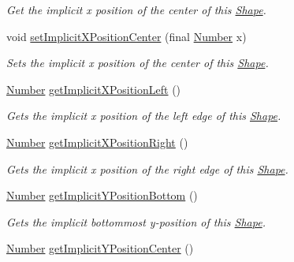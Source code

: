 \begin{DoxyCompactItemize}
\begin{DoxyCompactList}\small\item\em Get the implicit x position of the center of this \hyperlink{classcom_1_1aarrelaakso_1_1drawl_1_1_shape}{Shape}. \end{DoxyCompactList}\item 
void \hyperlink{classcom_1_1aarrelaakso_1_1drawl_1_1_shape_a945597709a9d79688e48a9802c86b13b}{set\+Implicit\+X\+Position\+Center} (final \hyperlink{interfacecom_1_1aarrelaakso_1_1drawl_1_1_number}{Number} x)
\begin{DoxyCompactList}\small\item\em Sets the implicit x position of the center of this \hyperlink{classcom_1_1aarrelaakso_1_1drawl_1_1_shape}{Shape}. \end{DoxyCompactList}\item 
\hyperlink{interfacecom_1_1aarrelaakso_1_1drawl_1_1_number}{Number} \hyperlink{classcom_1_1aarrelaakso_1_1drawl_1_1_shape_a2f272e8bfa625bb7959d1f722d5ac3df}{get\+Implicit\+X\+Position\+Left} ()
\begin{DoxyCompactList}\small\item\em Gets the implicit x position of the left edge of this \hyperlink{classcom_1_1aarrelaakso_1_1drawl_1_1_shape}{Shape}. \end{DoxyCompactList}\item 
\hyperlink{interfacecom_1_1aarrelaakso_1_1drawl_1_1_number}{Number} \hyperlink{classcom_1_1aarrelaakso_1_1drawl_1_1_shape_a15599ef4ee30a0ddd372f7cf1b155ce1}{get\+Implicit\+X\+Position\+Right} ()
\begin{DoxyCompactList}\small\item\em Gets the implicit x position of the right edge of this \hyperlink{classcom_1_1aarrelaakso_1_1drawl_1_1_shape}{Shape}. \end{DoxyCompactList}\item 
\hyperlink{interfacecom_1_1aarrelaakso_1_1drawl_1_1_number}{Number} \hyperlink{classcom_1_1aarrelaakso_1_1drawl_1_1_shape_a8d44b02976656bf4a81055a2dbae66cb}{get\+Implicit\+Y\+Position\+Bottom} ()
\begin{DoxyCompactList}\small\item\em Gets the implicit bottommost y-\/position of this \hyperlink{classcom_1_1aarrelaakso_1_1drawl_1_1_shape}{Shape}. \end{DoxyCompactList}\item 
\hyperlink{interfacecom_1_1aarrelaakso_1_1drawl_1_1_number}{Number} \hyperlink{classcom_1_1aarrelaakso_1_1drawl_1_1_shape_a1f27f0adc1716dc60691a7d0c14f2ace}{get\+Implicit\+Y\+Position\+Center} ()

\end{DoxyCompactItemize}
